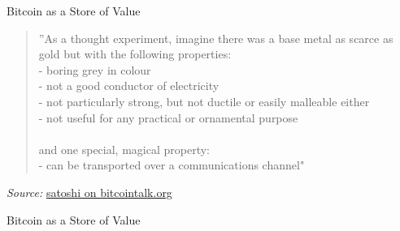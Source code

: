 \documentclass[]{beamer}
\begin{document}
\begin{frame}[fragile]{Bitcoin as a Store of Value}
	\begin{quote}{''As a thought experiment, imagine there was a base metal as scarce as gold but with the following properties:\\
	- boring grey in colour\\
	- not a good conductor of electricity\\
	- not particularly strong, but not ductile or easily malleable either\\
	- not useful for any practical or ornamental purpose\\
\hfill \\
	and one special, magical property:\\
	- can be transported over a communications channel"
		}
	\end{quote}

	\textit{Source:} \href{https://bitcointalk.org/index.php?topic=583.msg11405#msg11405}{\link satoshi on bitcointalk.org}
\end{frame}


\begin{frame}{Bitcoin as a Store of Value}
	\begin{figure}
		
	\end{figure}

\end{frame}
\end{document}
